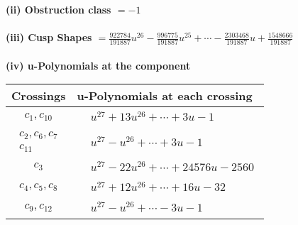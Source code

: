 \documentclass[1p]{elsarticle_modified}
\theoremstyle{definition}
\begin{document}
\flushleft \textbf{(ii) Obstruction class $= -1$}\\~\\
\flushleft \textbf{(iii) Cusp Shapes $= \frac{922784}{191887} u^{26}-\frac{996775}{191887} u^{25}+\cdots-\frac{2303468}{191887} u+\frac{1548666}{191887}$}\\~\\
\newpage\renewcommand{\arraystretch}{1}
\flushleft \textbf{(iv) u-Polynomials at the component}\newline \\
\begin{tabular}{m{50pt}|m{274pt}}
Crossings & \hspace{64pt}u-Polynomials at each crossing \\
\hline $$\begin{aligned}c_{1},c_{10}\end{aligned}$$&$\begin{aligned}
&u^{27}+13 u^{26}+\cdots+3 u-1
\end{aligned}$\\
\hline $$\begin{aligned}c_{2},c_{6},c_{7}\\c_{11}\end{aligned}$$&$\begin{aligned}
&u^{27}- u^{26}+\cdots+3 u-1
\end{aligned}$\\
\hline $$\begin{aligned}c_{3}\end{aligned}$$&$\begin{aligned}
&u^{27}-22 u^{26}+\cdots+24576 u-2560
\end{aligned}$\\
\hline $$\begin{aligned}c_{4},c_{5},c_{8}\end{aligned}$$&$\begin{aligned}
&u^{27}+12 u^{26}+\cdots+16 u-32
\end{aligned}$\\
\hline $$\begin{aligned}c_{9},c_{12}\end{aligned}$$&$\begin{aligned}
&u^{27}- u^{26}+\cdots-3 u-1
\end{aligned}$\\
\hline
\end{tabular}\\~\\
\newpage\renewcommand{\arraystretch}{1}
\end{document}
